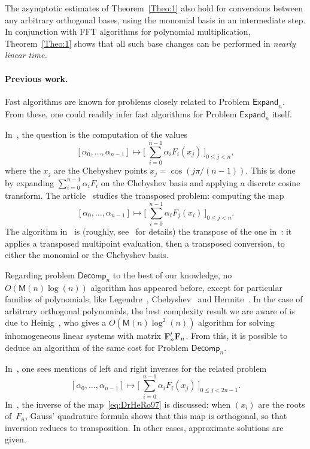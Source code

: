 \documentclass{elsart}
\def\M {\ensuremath{\mathsf{M}}}
\def\E{\textsf{Expand}}
\def\D{\textsf{Decomp}}
\begin{document}
The asymptotic estimates of Theorem~\ref{Theo:1} also hold for
conversions between any arbitrary orthogonal bases, using the monomial
basis in an intermediate step. In conjunction with FFT algorithms for
polynomial multiplication, Theorem~\ref{Theo:1} shows that all such
base changes can be performed in \emph{nearly linear time.}




\paragraph*{Previous work.} 
Fast algorithms are known for problems closely related to Problem
$\E_n$. {}From these, one could readily infer fast algorithms for
Problem $\E_n$ itself.

In~\cite{PoStTa98}, the question is the computation of the values
$$[\alpha_0,\dots,\alpha_{n-1}] \mapsto \big [~ \sum_{i=0}^{n-1}
\alpha_i F_i(x_j) ~\big ]_{0 \le j < n},$$ where the $x_j$ are the
Chebyshev points $x_j=\cos(j\pi/(n-1))$. This is done by expanding
$\sum_{i=0}^{n-1} \alpha_i F_i$ on the Chebyshev basis and applying a
discrete cosine transform. The article~\cite{DrHeRo97} studies the
transposed problem: computing the map
\begin{equation}\label{eq:DrHeRo97}[\alpha_0,\dots,\alpha_{n-1}] \mapsto \big [~ \sum_{i=0}^{n-1} \alpha_i F_j(x_i) ~\big
]_{0 \le j < n}.\end{equation} The algorithm in~\cite{DrHeRo97} is
(roughly, see~\cite{PoStTa98} for details) the transpose of the one
in~\cite{PoStTa98}: it applies a transposed multipoint evaluation, then 
a transposed conversion, to either the monomial or the Chebyshev basis.

Regarding problem $\D_n$ to the best of our knowledge, no $O(\M(n)
\log(n))$ algorithm has appeared before, except for particular
families of polynomials, like Legendre~\cite{Frumkin95},
Chebyshev~\cite{Pan98} and Hermite~\cite{LeRoCh07}. In the case of
arbitrary orthogonal polynomials, the best complexity result we are
aware of is due to Heinig~\cite{Heinig01}, who gives a
$O(\M(n)\log^2(n))$ algorithm for solving inhomogeneous linear systems
with matrix ${\bf F}_n^t {\bf F}_n$. {}From this, it is possible to
deduce an algorithm of the same cost for Problem $\D_n$.

In~\cite{PoStTa98}, one sees mentions of left and right inverses for
the related problem
$$[\alpha_0,\dots,\alpha_{n-1}] \mapsto \big [~ \sum_{i=0}^{n-1}
\alpha_i F_i(x_j) ~\big ]_{0 \le j < 2n-1}.$$ In~\cite{LeRoCh07}, the
inverse of the map~\eqref{eq:DrHeRo97} is discussed: when $(x_i)$ are
the roots of~$F_{n}$, Gauss' quadrature formula shows that this map is
orthogonal, so that inversion reduces to transposition. In other
cases, approximate solutions are given.
\end{document}
